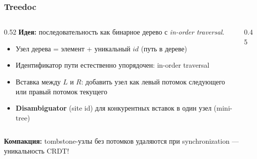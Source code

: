 \documentclass{beamer}
\begin{document}
\begin{frame}
\frametitle{Treedoc}

\begin{columns}
\begin{column}{0.52\textwidth}
\textbf{Идея:} последовательность как бинарное дерево с \emph{in-order traversal}.

\begin{itemize}
  \item Узел дерева = элемент + уникальный $id$ (путь в дереве)
  \item Идентификатор пути естественно упорядочен: in-order traversal
  \item Вставка между $L$ и $R$: добавить узел как левый потомок следующего или правый потомок текущего
  \item \textbf{Disambiguator} (site id) для конкурентных вставок в один узел (mini-tree)
\end{itemize}
\end{column}
\begin{column}{0.45\textwidth}
\end{column}
\end{columns}

\medskip
\textbf{Компакция:} tombstone-узлы без потомков удаляются при synchronization — уникальность CRDT!


\end{frame}
\end{document}
